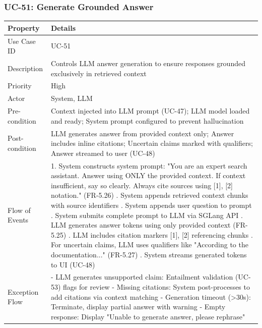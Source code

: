 \subsubsection*{UC-51: Generate Grounded Answer}

\begin{table}[H]
\small
\begin{tabularx}{\textwidth}{|p{}|X|}
\hline
\textbf{Property} & \textbf{Details} \\
\hline
Use Case ID & UC-51 \\
\hline
Description & Controls LLM answer generation to ensure responses grounded exclusively in retrieved context \\
\hline
Priority & High \\
\hline
Actor & System, LLM \\
\hline
Pre-condition & Context injected into LLM prompt (UC-47); LLM model loaded and ready; System prompt configured to prevent hallucination \\
\hline
Post-condition & LLM generates answer from provided context only; Answer includes inline citations; Uncertain claims marked with qualifiers; Answer streamed to user (UC-48) \\
\hline
Flow of Events & 1. System constructs system prompt: "You are an expert search assistant. Answer using ONLY the provided context. If context insufficient, say so clearly. Always cite sources using [1], [2] notation." (FR-5.26) \newline 2. System appends retrieved context chunks with source identifiers \newline 3. System appends user question to prompt \newline 4. System submits complete prompt to LLM via SGLang API \newline 5. LLM generates answer tokens using only provided context (FR-5.25) \newline 6. LLM includes citation markers [1], [2] referencing chunks \newline 7. For uncertain claims, LLM uses qualifiers like "According to the documentation..." (FR-5.27) \newline 8. System streams generated tokens to UI (UC-48) \\
\hline
Exception Flow & - LLM generates unsupported claim: Entailment validation (UC-53) flags for review \newline - Missing citations: System post-processes to add citations via context matching \newline - Generation timeout (>30s): Terminate, display partial answer with warning \newline - Empty response: Display "Unable to generate answer, please rephrase" \\
\hline
\end{tabularx}
\end{table}

\clearpage
